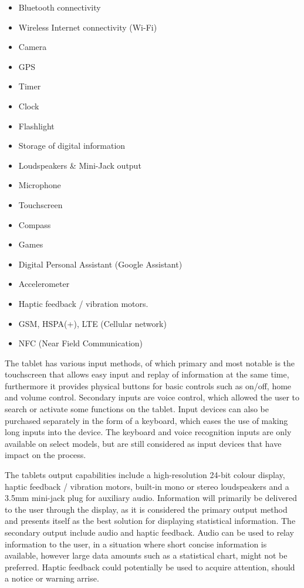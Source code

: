 \begin{itemize}[noitemsep]
    \item Bluetooth connectivity
    \item Wireless Internet connectivity (Wi-Fi)
    \item Camera
    \item GPS
    \item Timer
    \item Clock
    \item Flashlight
    \item Storage of digital information
    \item Loudspeakers \& Mini-Jack output
    \item Microphone
    \item Touchscreen
    \item Compass
    \item Games
    \item Digital Personal Assistant (Google Assistant)
    \item Accelerometer
    \item Haptic feedback / vibration motors.
    \item GSM, HSPA(+), LTE (Cellular network)
    \item NFC (Near Field Communication)
\end{itemize}

The tablet has various input methods, of which primary and most notable is the touchscreen that allows easy input and replay of information at the same time, furthermore it provides physical buttons for basic controls such as on/off, home and volume control. Secondary inputs are voice control, which allowed the user to search or activate some functions on the tablet. Input devices can also be purchased separately in the form of a keyboard, which eases the use of making long inputs into the device. The keyboard and voice recognition inputs are only available on select models, but are still considered as input devices that have impact on the process.

The tablets output capabilities include a high-resolution 24-bit colour display, haptic feedback / vibration motors, built-in mono or stereo loudspeakers and a 3.5mm mini-jack plug for auxiliary audio.   Information will primarily be delivered to the user through the display, as it is considered the primary output method and presents itself as the best solution for displaying statistical information. The secondary output include audio and haptic feedback. Audio can be used to relay information to the user, in a situation where short concise information is available, however large data amounts such as a statistical chart, might not be preferred. Haptic feedback could potentially be used to acquire attention, should a notice or warning arrise. 

